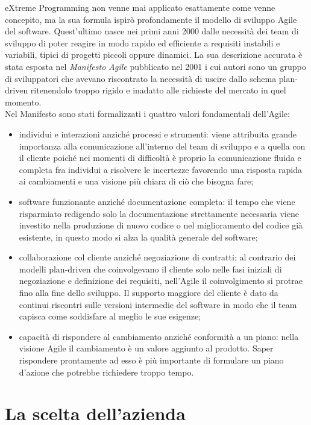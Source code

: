 \documentclass[target=bach,aauheader=,style=]{thud}
\begin{document}
eXtreme Programming non venne mai applicato esattamente come venne concepito, ma la sua formula ispirò profondamente il modello di sviluppo Agile del software.
Quest'ultimo nasce nei primi anni 2000 dalle necessità dei team di sviluppo di poter reagire in modo rapido ed efficiente a requisiti instabili e variabili, tipici di progetti piccoli oppure dinamici.
La sua descrizione accurata è stata esposta nel \textit{Manifesto Agile} \cite{beck2001agile} pubblicato nel 2001 i cui autori sono un gruppo di sviluppatori che avevano riscontrato la necessità di
uscire dallo schema plan-driven ritenendolo troppo rigido e inadatto alle richieste del mercato in quel momento.\\ Nel Manifesto sono stati formalizzati i quattro valori fondamentali dell'Agile:
\begin{itemize}
    \item individui e interazioni anziché processi e strumenti: viene attribuita grande importanza alla comunicazione all'interno del
    team di sviluppo e a quella con il cliente poiché nei momenti di difficoltà è proprio la comunicazione fluida e completa fra individui
    a risolvere le incertezze favorendo una risposta rapida ai cambiamenti e una visione più chiara di ciò che bisogna fare;
    \item software funzionante anziché documentazione completa: il tempo che viene risparmiato redigendo solo la documentazione strettamente
    necessaria viene investito nella produzione di nuovo codice o nel miglioramento del codice già esistente, in questo modo si alza
    la qualità generale del software;
    \item collaborazione col cliente anziché negoziazione di contratti: al contrario dei modelli plan-driven che coinvolgevano il cliente
    solo nelle fasi iniziali di negoziazione e definizione dei requisiti, nell'Agile il coinvolgimento si protrae fino alla fine dello sviluppo.
    Il supporto maggiore del cliente è dato da continui riscontri sulle versioni intermedie del software in modo che il team capisca come soddisfare al meglio le sue esigenze;
    \item capacità di rispondere al cambiamento anziché conformità a un piano: nella visione Agile il cambiamento è un valore aggiunto al
    prodotto. Saper rispondere prontamente ad esso è più importante di formulare un piano d'azione che potrebbe richiedere troppo tempo.
\end{itemize}

\section{La scelta dell'azienda}
\end{document}

